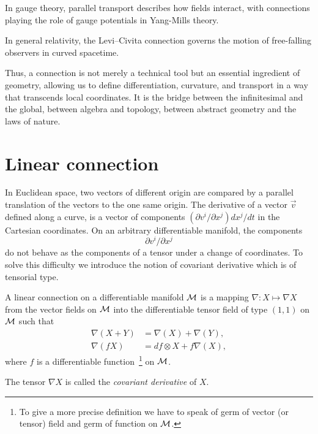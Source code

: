 In gauge theory, parallel transport describes how fields interact, with connections playing the role of gauge potentials in Yang-Mills theory.

In general relativity, the Levi--Civita connection governs the motion of free-falling observers in curved spacetime.

Thus, a connection is not merely a technical tool but an essential ingredient of geometry, allowing us to define differentiation, curvature, and transport in a way that transcends local coordinates. It is the bridge between the infinitesimal and the global, between algebra and topology, between abstract geometry and the laws of nature.

\section{Linear connection}

In Euclidean space,  two vectors of different origin are compared by a parallel translation of the vectors to the one same origin. The derivative of a vector $\Vec{v}$ defined along a curve, is a vector of components $(\partial v^{i}/\partial x^{j}) dx^{j}/dt$ in the Cartesian coordinates. On an arbitrary differentiable manifold, the components  $$\partial v^{i}/\partial x^{j}$$ do not behave as the components of a tensor under a change of coordinates. To solve this difficulty we introduce the notion of  covariant derivative which is of tensorial type. 


\begin{definition}\label{lincon}
A linear connection on a differentiable manifold $\mathcal{M}$ is a mapping $\nabla : X\mapsto \nabla X$ from the vector fields on $\mathcal{M}$ into the differentiable tensor field of type $(1,1)$ on $\mathcal{M}$ such that
\begin{equation}\begin{aligned}
\nabla(X+Y)&=\nabla(X)+\nabla(Y),\\
\nabla(fX)&=df\otimes X+f\nabla(X), 
\end{aligned}\end{equation}
where $f$ is a differentiable function~\footnote{To give a more precise definition we have to speak  of germ of vector (or tensor) field and germ of function on $\mathcal{M}$. } on $\mathcal{M}$.

\vspace{3pt}
The tensor $\nabla X $ is called the \emph{covariant derivative}  of $X$.
\end{definition}


